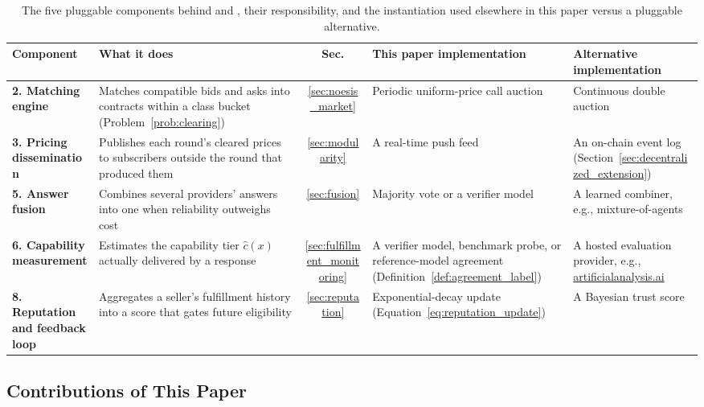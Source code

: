 \begin{samepage}
  \begin{table}[H]
    \centering
    \scriptsize
    \begin{tabular}{>{\raggedright\arraybackslash}p{2.4cm}|p{3.3cm}|c|p{2.9cm}|p{2.9cm}|}
      \textbf{Component} & \textbf{What it does} & \textbf{Sec.} & \textbf{This paper implementation} & \textbf{Alternative implementation} \\
      \hline
      \textbf{2. Matching engine} & Matches compatible bids and asks into contracts within a class bucket (Problem~\ref{prob:clearing}) & \ref{sec:noesis_market} & Periodic uniform-price call auction & Continuous double auction \\
      \hline
      \textbf{3. Pricing dissemination} & Publishes each round's cleared prices to subscribers outside the round that produced them & \ref{sec:modularity} & A real-time push feed & An on-chain event log (Section~\ref{sec:decentralized_extension}) \\
      \hline
      \textbf{5. Answer fusion} & Combines several providers' answers into one when reliability outweighs cost & \ref{sec:fusion} & Majority vote or a verifier model & A learned combiner, e.g., mixture-of-agents \cite{wang2024moa} \\
      \hline
      \textbf{6. Capability measurement} & Estimates the capability tier $\hat c(x)$ actually delivered by a response & \ref{sec:fulfillment_monitoring} & A verifier model, benchmark probe, or reference-model agreement (Definition~\ref{def:agreement_label}) & A hosted evaluation provider, e.g., \href{https://artificialanalysis.ai}{artificialanalysis.ai} \\
      \hline
      \textbf{8. Reputation and feedback loop} & Aggregates a seller's fulfillment history into a score that gates future eligibility & \ref{sec:reputation} & Exponential-decay update (Equation~\eqref{eq:reputation_update}) & A Bayesian trust score \\
      \hline
    \end{tabular}
    \caption{The five pluggable components behind \NoesisMarket{} and
      \NoesisServer, their responsibility, and the instantiation used
      elsewhere in this paper versus a pluggable alternative.}
    \label{tab:components}
  \end{table}
\end{samepage}

\subsection{Contributions of This Paper}
\label{sec:contributions}

